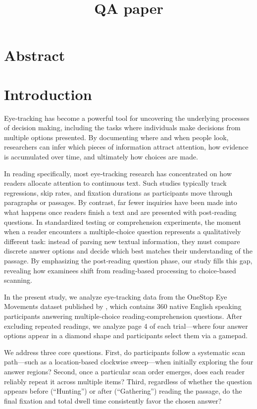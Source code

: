 \documentclass{article}
\title{QA paper}
\date{}
\author{}
\begin{document}
\maketitle


\section{Abstract}


\section{Introduction}
    Eye‐tracking has become a powerful tool for uncovering the underlying processes of decision making, including the tasks where individuals make decisions from multiple options presented. By documenting where and when people look, researchers can infer which pieces of information attract attention, how evidence is accumulated over time, and ultimately how choices are made.

    In reading specifically, most eye‐tracking research has concentrated on how readers allocate attention to continuous text. Such studies typically track regressions, skip rates, and fixation durations as participants move through paragraphs or passages. By contrast, far fewer inquiries have been made into what happens once readers finish a text and are presented with post‐reading questions. In standardized testing or comprehension experiments, the moment when a reader encounters a multiple‐choice question represents a qualitatively different task: instead of parsing new textual information, they must compare discrete answer options and decide which best matches their understanding of the passage. By emphasizing the post‐reading question phase, our study fills this gap, revealing how examinees shift from reading‐based processing to choice‐based scanning. 
    
    In the present study, we analyze eye‐tracking data from the OneStop Eye Movements dataset published by \cite{berzak2025onestop}, which contains 360 native English speaking participants answering multiple‐choice reading‐comprehension questions. After excluding repeated readings, we analyze page 4 of each trial—where four answer options appear in a diamond shape and participants select them via a gamepad.

    We address three core questions. First, do participants follow a systematic scan path—such as a location-based clockwise sweep—when initially exploring the four answer regions? Second, once a particular scan order emerges, does each reader reliably repeat it across multiple items? Third, regardless of whether the question appears before (“Hunting”) or after (“Gathering”) reading the passage, do the final fixation and total dwell time consistently favor the chosen answer?
\end{document}
